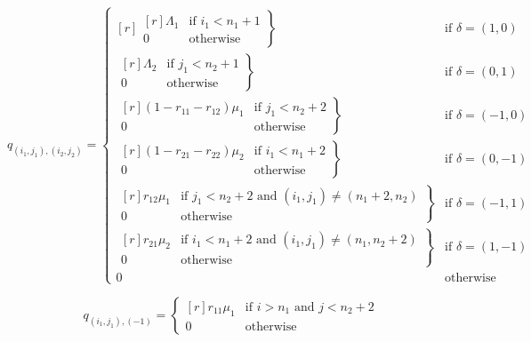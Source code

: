 \documentclass{article}
\begin{document}
\begin{equation}
  q_{(i_1, j_1),(i_2, j_2)} = \left\{
  \begin{matrix*}[ r ]
    \left. \begin{matrix*}[ r ]
      \Lambda_1 & \text{if } i_1 < n_1 + 1 \\
      0 & \text{otherwise}
    \end{matrix*} \right\} & \text{if } \delta = (1, 0) \\
    \left. \begin{matrix*}[ r ]
      \Lambda_2 & \text{if } j_1 < n_2 + 1 \\
      0 & \text{otherwise}
    \end{matrix*} \right\} & \text{if } \delta = (0, 1) \\
    \left. \begin{matrix*}[ r ]
      (1 - r_{11} - r_{12})\mu_1 & \text{if } j_1 < n_2 + 2 \\
      0 & \text{otherwise}
    \end{matrix*} \right\} & \text{if } \delta = (-1, 0) \\
    \left. \begin{matrix*}[ r ]
      (1 - r_{21} - r_{22})\mu_2 & \text{if } i_1 < n_1 + 2 \\
      0 & \text{otherwise}
    \end{matrix*} \right\} & \text{if } \delta = (0, -1) \\
    \left. \begin{matrix*}[ r ]
      r_{12}\mu_1 & \text{if } j_1 < n_2 + 2 \text{ and } (i_1, j_1) \neq (n_1 + 2, n_2) \\
      0 & \text{otherwise}
    \end{matrix*} \right\} & \text{if } \delta = (-1, 1) \\
    \left. \begin{matrix*}[ r ]
      r_{21}\mu_2 & \text{if } i_1 < n_1 + 2 \text{ and } (i_1, j_1) \neq (n_1, n_2 + 2) \\
      0 & \text{otherwise}
    \end{matrix*} \right\} & \text{if } \delta = (1, -1) \\
    0 & \text{otherwise}
  \end{matrix*} \right.
\end{equation}

\begin{equation}\label{equ:todeadlock2}
  q_{(i_1, j_1), (-1)} = \left\{
  \begin{matrix*}[ r ]
    r_{11}\mu_1 & \text{if } i > n_1 \text{ and } j < n_2 + 2 \\
    0 & \text{otherwise}
  \end{matrix*}
  \right.
\end{equation}
\end{document}
